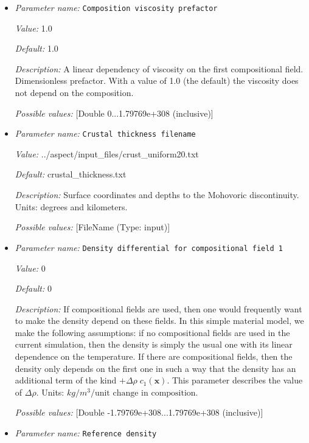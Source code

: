 \begin{itemize}
\item {\it Parameter name:} {\tt Composition viscosity prefactor}


{\it Value:} 1.0


{\it Default:} 1.0


{\it Description:} A linear dependency of viscosity on the first compositional field. Dimensionless prefactor. With a value of 1.0 (the default) the viscosity does not depend on the composition.


{\it Possible values:} [Double 0...1.79769e+308 (inclusive)]
\item {\it Parameter name:} {\tt Crustal thickness filename}


{\it Value:} ../aspect/input_files/crust_uniform20.txt


{\it Default:} crustal_thickness.txt


{\it Description:} Surface coordinates and depths to the Mohovoric discontinuity. Units: degrees and kilometers.


{\it Possible values:} [FileName (Type: input)]
\item {\it Parameter name:} {\tt Density differential for compositional field 1}


{\it Value:} 0


{\it Default:} 0


{\it Description:} If compositional fields are used, then one would frequently want to make the density depend on these fields. In this simple material model, we make the following assumptions: if no compositional fields are used in the current simulation, then the density is simply the usual one with its linear dependence on the temperature. If there are compositional fields, then the density only depends on the first one in such a way that the density has an additional term of the kind $+\Delta \rho \; c_1(\mathbf x)$. This parameter describes the value of $\Delta \rho$. Units: $kg/m^3/\textrm{unit change in composition}$.


{\it Possible values:} [Double -1.79769e+308...1.79769e+308 (inclusive)]
\item {\it Parameter name:} {\tt Reference density}



\end{itemize}
